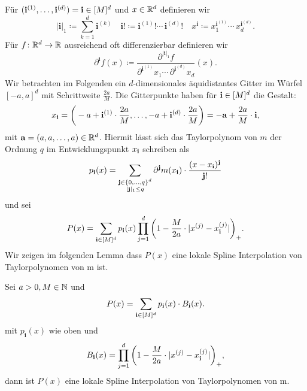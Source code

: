 Für $(\mathbf{i}^{(1)},\dots,\mathbf{i}^{(d)}) = \mathbf{i} \in [M]^d$ und $x \in \mathbb{R}^d$ definieren wir
$$|\mathbf{i}|_1 \coloneqq \sum_{k= 1}^d \mathbf{i}^{(k)} \quad \mathbf{i}! \coloneqq \mathbf{i}^{(1)}! \cdots \, \mathbf{i}^{(d)}! \quad x^{\mathbf{i}} \coloneqq x_1^{\mathbf{i}^{(1)}} \cdots \,    x_d^{\mathbf{i}^{(d)}}.$$
Für $f\colon \mathbb{R}^d \to \mathbb{R}$ ausreichend oft differenzierbar definieren wir 
$$\partial^{\mathbf{i}}f(x) \coloneqq \frac{\partial^{|\mathbf{i}|_1}f}{\partial^{\mathbf{i}^{(1)}} x_1 \cdots \, \partial^{\mathbf{i}^{(d)}} x_d} (x).$$
Wir betrachten im Folgenden ein $d$-dimensionales äquidistantes Gitter im Würfel $[-a, a]^d$ mit Schrittweite $\frac{2a}{M}.$ Die Gitterpunkte haben für $\mathbf{i} \in [M]^d$ die Gestalt:
$$x_{\mathbf{i}} = \bigg( -a + \mathbf{i}^{(1)} \cdot \frac{2a}{M},\dots, -a + \mathbf{i}^{(d)} \cdot \frac{2a}{M}\bigg) = -\mathbf{a} + \frac{2a}{M} \cdot \mathbf{i},$$
mit $\mathbf{a} = (a, a, \dots, a) \in \mathbb{R}^d$.
Hiermit lässt sich das Taylorpolynom von $m$ der Ordnung $q$ im Entwicklungspunkt $x_{\mathbf{i}}$ schreiben als
$$p_{\mathbf{i}}(x) = \sum_{\substack{\mathbf{j} \in \{0,\dots,q\}^d \\|\mathbf{j}|_1 \leq q}} \partial^{\mathbf{j}}m(x_{\mathbf{i}}) \cdot \frac{(x - x_{\mathbf{i}})^{\mathbf{j}}}{\mathbf{j}!}$$
und sei
\begin{equation}
\label{konvexkomb}
P(x) = \sum_{\mathbf{i} \in [M]^d} p_{\mathbf{i}}(x) \prod_{j = 1}^{d} \bigg(1 - \frac{M}{2a} \cdot |x^{(j)} - x_{\mathbf{i}}^{(j)}|\bigg)_+.
\end{equation}
Wir zeigen im folgenden Lemma dass $P(x)$ eine lokale Spline Interpolation von Taylorpolynomen von m ist.
\begin{lem}
\label{lem:loccon}
Sei $a >0, M \in \mathbb{N}$ und $$P(x) = \sum_{\mathbf{i} \in [M]^d} p_{\mathbf{i}}(x) \cdot B_{\mathbf{i}}(x).$$ mit $p_{\mathbf{i}}(x)$ wie oben und 
$$B_{\mathbf{i}}(x) = \prod_{j = 1}^{d} \bigg(1 - \frac{M}{2a} \cdot |x^{(j)} - x_{\mathbf{i}}^{(j)}|\bigg)_+,$$
dann ist $P(x)$ eine lokale Spline Interpolation von Taylorpolynomen von m.
\end{lem}
